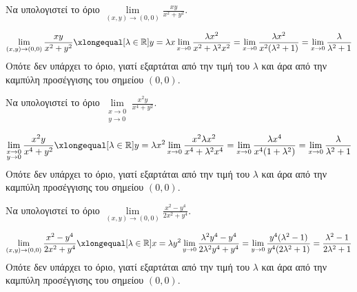 \begin{example}
  Να υπολογιστεί το όριο $ \lim\limits_{(x,y)\to (0, 0)} \frac{xy}{x^{2}+y^{2}} $.
  \begin{solution}
    \[
      \lim\limits_{(x,y)\to (0, 0)} \frac{xy}{x^{2}+y^{2}} 
      \xlongequal[\lambda \in \mathbb{R}]{y= \lambda x} \lim_{x \to 0}
      \frac{\lambda x^{2}}{x^{2}+ \lambda^{2} x^{2}} = \lim_{x \to 0} 
      \frac{\lambda x^{2}}{x^{2}(\lambda ^{2}+1)} = \lim_{x \to 0} 
      \frac{\lambda}{\lambda ^{2}+1} 
    \]
    Οπότε δεν υπάρχει το όριο, γιατί εξαρτάται από την τιμή του 
    $ \lambda $ και άρα από την καμπύλη προσέγγισης του σημείου 
    $ (0,0) $.
  \end{solution}
\end{example}

\begin{example}
  Να υπολογιστεί το όριο $ \lim\limits_{\substack{x\to 0 \\y \to 0}} 
  \frac{x^{2}y}{x^{4}+y^{2}} $.
  \begin{solution}
    \[
      \lim\limits_{\substack{x\to 0 \\y \to 0}} 
      \frac{x^{2}y}{x^{4}+y^{2}} 
      \xlongequal[\lambda \in \mathbb{R}]{y= \lambda x^{2}} 
      \lim_{x \to 0} \frac{x^{2} \lambda x^{2}}
      {x^{4}+\lambda^{2}x^{4}} = \lim_{x\to 0} 
      \frac{\lambda x^{4}}{x^{4}(1+\lambda ^{2})} = 
      \lim_{x \to 0} \frac{\lambda}{\lambda ^{2}+1} 
    \] 
    Οπότε δεν υπάρχει το όριο, γιατί εξαρτάται από την τιμή του $ \lambda $ 
    και άρα από την καμπύλη προσέγγισης του σημείου $ (0,0) $.
  \end{solution}
\end{example}

\begin{example}
  Να υπολογιστεί το όριο $ \lim\limits_{(x,y)\to (0, 0)} \frac{x^{2}-y^{4}}
  {2x^{2}+y^{4}} $. 
  \begin{solution}
    \[
      \lim\limits_{(x,y)\to (0, 0)} \frac{x^{2}-y^{4}}
      {2x^{2}+y^{4}} \xlongequal[\lambda \in \mathbb{R}]
      {x= \lambda y^{2}} \lim_{y \to 0} 
      \frac{\lambda ^{2}y^{4}-y^{4}}{2 \lambda ^{2}y^{4}+y^{4}} = 
      \lim_{y \to 0} \frac{y^{4}(\lambda ^{2}-1)}
      {y^{4}(2 \lambda ^{2}+1)} = 
      \frac{\lambda ^{2}-1}{2 \lambda ^{2}+1} 
    \] 
    Οπότε δεν υπάρχει το όριο, γιατί εξαρτάται από την τιμή του $ \lambda $ 
    και άρα από την καμπύλη προσέγγισης του σημείου $ (0,0) $.
  \end{solution}
\end{example}


